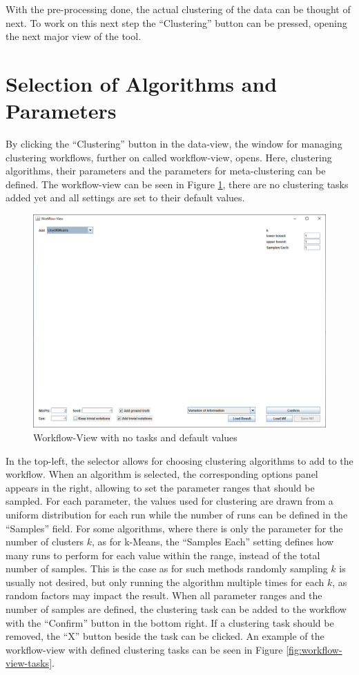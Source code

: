 \documentclass[
	a4paper,
	english,
	twoside,
	openright,               
	11pt                            
	]{report}
\begin{document}
With the pre-processing done, the actual clustering of the data can be thought of next. To work on this next step the ``Clustering'' button can be pressed, opening the next major view of the tool.

\section{Selection of Algorithms and Parameters}\label{sec:sel_alg_param}
By clicking the ``Clustering'' button in the data-view, the window for managing clustering workflows, further on called workflow-view, opens. Here, clustering algorithms, their parameters and the parameters for meta-clustering can be defined. The workflow-view can be seen in Figure \ref{fig:workflow-view}, there are no clustering tasks added yet and all settings are set to their default values.

\begin{figure}[h]
	\centering
	\includegraphics[scale=.43]{workflow-view}
	\caption{Workflow-View with no tasks and default values}
	\label{fig:workflow-view}
\end{figure}

In the top-left, the selector allows for choosing clustering algorithms to add to the workflow. When an algorithm is selected, the corresponding options panel appears in the right, allowing to set the parameter ranges that should be sampled. For each parameter, the values used for clustering are drawn from a uniform distribution for each run while the number of runs can be defined in the ``Samples'' field. For some algorithms, where there is only the parameter for the number of clusters $k$, as for k-Means, the ``Samples Each'' setting defines how many runs to perform for each value within the range, instead of the total number of samples. This is the case as for such methods randomly sampling $k$ is usually not desired, but only running the algorithm multiple times for each $k$, as random factors may impact the result. When all parameter ranges and the number of samples are defined, the clustering task can be added to the workflow with the ``Confirm'' button in the bottom right. If a clustering task should be removed, the ``X'' button beside the task can be clicked. An example of the workflow-view with defined clustering tasks can be seen in Figure \ref{fig:workflow-view-tasks}.
\end{document}
